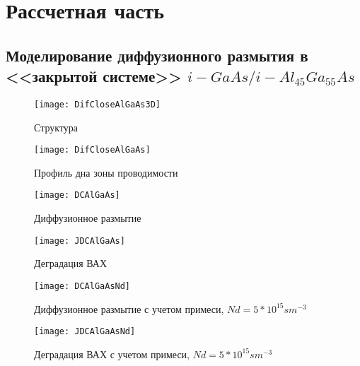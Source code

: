 \chapter{Рассчетная часть}
\section{Моделирование диффузионного размытия в <<закрытой системе>> $i\!-\!GaAs/i\!-\!Al_{45}Ga_{55}As$}
\begin{figure}[h]
	\centering
    \texttt{[image: DifCloseAlGaAs3D]}
    \caption{Структура}
\end{figure}
\begin{figure}[h]
	\centering
    \texttt{[image: DifCloseAlGaAs]}
    \caption{Профиль дна зоны проводимости}
\end{figure}

\begin{figure}[h]
  \centering
  \texttt{[image: DCAlGaAs]}
  \caption{Диффузионное размытие}
\end{figure}

\begin{figure}[h]
  \centering
  \texttt{[image: JDCAlGaAs]}
  \caption{Деградация ВАХ}
\end{figure}

\begin{figure}[h]
  \centering
  \texttt{[image: DCAlGaAsNd]}
  \caption{Диффузионное размытие с учетом примеси, $Nd = 5*10^{15}sm^{-3}$}
\end{figure}

\begin{figure}[h]
  \centering
  \texttt{[image: JDCAlGaAsNd]}
  \caption{Деградация ВАХ с учетом примеси, $Nd = 5*10^{15}sm^{-3}$}
\end{figure}